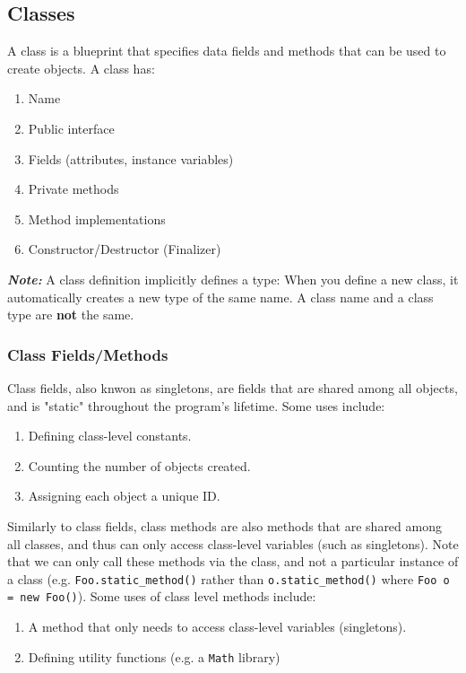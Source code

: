 \documentclass{article}
\begin{document}
\subsection{Classes}
A class is a blueprint that specifies data fields and methods that can
be used to create objects. A class has:
\begin{enumerate}[label=(\roman*)]
\item Name
\item Public interface
\item Fields (attributes, instance variables)
\item Private methods
\item Method implementations
\item Constructor/Destructor (Finalizer)
\end{enumerate}
\textit{\textbf{Note:}} A class definition implicitly defines a type: When you
define a new class, it automatically creates a new type of the same
name. A class name and a class type are \textbf{not} the same.

\subsubsection{Class Fields/Methods}
Class fields, also knwon as singletons, are fields that are shared
among all objects, and is "static" throughout the program's
lifetime. Some uses include:
\begin{enumerate}[label=(\roman*)]
\item Defining class-level constants.
\item Counting the number of objects created.
\item Assigning each object a unique ID.
\end{enumerate}
Similarly to class fields, class methods are also methods that are
shared among all classes, and thus can only access class-level
variables (such as singletons). Note that we can only call these
methods via the class, and not a particular instance of a class
(e.g. \texttt{Foo.static\_method()} rather than
\texttt{o.static\_method()} where \texttt{Foo o = new Foo()}). Some
uses of class level methods include:
\begin{enumerate}[label=(\roman*)]
\item A method that only needs to access class-level variables
  (singletons).
\item Defining utility functions (e.g. a \texttt{Math} library)
\end{enumerate}
\end{document}
